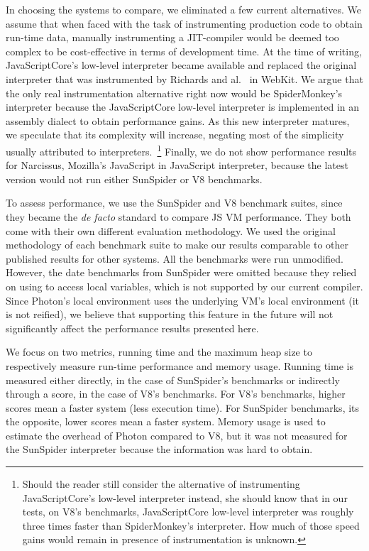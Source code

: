 In choosing the systems to compare, we eliminated a few current alternatives.
We assume that when faced with the task of instrumenting production code to
obtain run-time data, manually instrumenting a JIT-compiler would be deemed too
complex to be cost-effective in terms of development time. At the time of
writing, JavaScriptCore's low-level interpreter became available and replaced
the original interpreter that was instrumented by Richards and
al.~\cite{behavior_js} in WebKit.  We argue that the only real instrumentation
alternative right now would be SpiderMonkey's interpreter because the
JavaScriptCore low-level interpreter is implemented in an assembly dialect to
obtain performance gains. As this new interpreter matures, we speculate that
its complexity will increase, negating most of the simplicity usually
attributed to interpreters.~\footnote{Should the reader still consider the
alternative of instrumenting JavaScriptCore's low-level interpreter instead,
she should know that in our tests, on V8's benchmarks, JavaScriptCore low-level
interpreter was roughly three times faster than SpiderMonkey's interpreter. How
much of those speed gains would remain in presence of instrumentation is
unknown.} Finally, we do not show performance results for Narcissus, Mozilla's
JavaScript in JavaScript interpreter, because the latest version would not run
either SunSpider or V8 benchmarks.

To assess performance, we use the SunSpider and V8 benchmark suites, since they
became the \textit{de facto} standard to compare JS VM performance. They both
come with their own different evaluation methodology. We used the original
methodology of each benchmark suite to make our results comparable to other
published results for other systems. All the benchmarks were run unmodified.
However, the date benchmarks from SunSpider were omitted because they relied on
using  to access local variables, which is not supported by our
current compiler.  Since Photon's local environment uses the underlying VM's
local environment (it is not reified), we believe that supporting this feature
in the future will not significantly affect the performance results presented
here.

We focus on two metrics, running time and the maximum heap size to respectively
measure run-time performance and memory usage. Running time is measured either
directly, in the case of SunSpider's benchmarks or indirectly through a score,
in the case of V8's benchmarks. For V8's benchmarks, higher scores mean a
faster system (less execution time). For SunSpider benchmarks, its the
opposite, lower scores mean a faster system.  Memory usage is used to estimate
the overhead of Photon compared to V8, but it was not measured for the
SunSpider interpreter because the information was hard to obtain.

